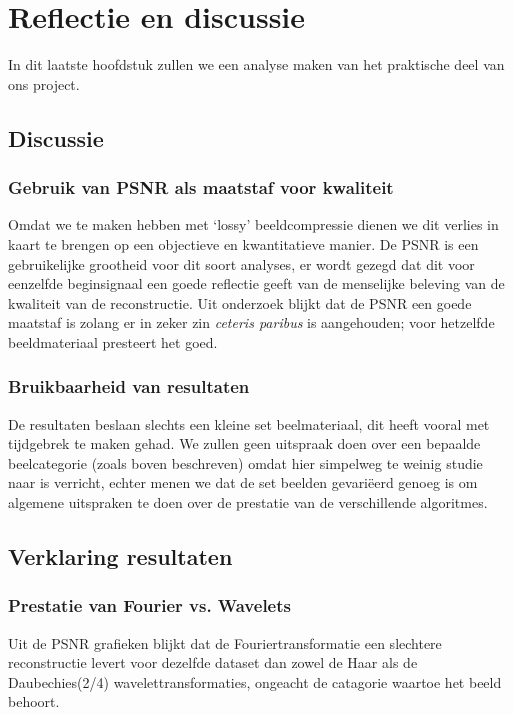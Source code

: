 \chapter{Reflectie en discussie}
In dit laatste hoofdstuk zullen we een analyse maken van het praktische deel van ons project.

\section{Discussie}
\subsection{Gebruik van PSNR als maatstaf voor kwaliteit}
Omdat we te maken hebben met `lossy' beeldcompressie dienen we dit verlies in kaart te brengen op een 
objectieve en kwantitatieve manier. 
De PSNR is een gebruikelijke grootheid voor dit soort analyses, er wordt gezegd dat dit voor eenzelfde 
beginsignaal een goede reflectie geeft van de menselijke beleving van de kwaliteit van de reconstructie.
Uit onderzoek\cite{PSNR} blijkt dat de PSNR een goede maatstaf is zolang er in zeker zin \emph{ceteris paribus}
is aangehouden; voor hetzelfde beeldmateriaal presteert het goed.

\subsection{Bruikbaarheid van resultaten}

De resultaten beslaan slechts een kleine set beelmateriaal, dit heeft vooral met tijdgebrek te maken gehad.
We zullen geen uitspraak doen over een bepaalde beelcategorie (zoals boven beschreven) omdat hier simpelweg te
weinig studie naar is verricht, echter menen we dat de set beelden gevari\"eerd genoeg is om algemene uitspraken te doen
over de prestatie van de verschillende algoritmes.

\section{Verklaring resultaten}

\subsection{Prestatie van Fourier vs. Wavelets}
Uit de PSNR grafieken blijkt dat de Fouriertransformatie een slechtere reconstructie levert voor dezelfde dataset
dan zowel de Haar als de Daubechies(2/4) wavelettransformaties, ongeacht de catagorie waartoe het beeld behoort.

